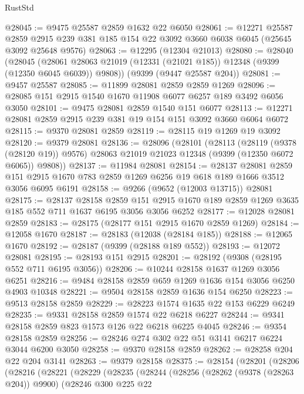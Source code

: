\begin{lexlean}{RustStd}
\begin{coremodule}
@28045 := @9475 @25587 @2859 @1632 @22 @6050
@28061 := @12271
    @25587
    @2859
    @2915
    @239
    @381
    @185
    @154
    @22
    @3092
    @3660
    @6038
    @6045
    (@25645 @3092 @25648 @9576)
@28063 := @12295 (@12304 @21013)
@28080 := @28040
    (@28045 (@28061 @28063 @21019 (@12331 (@21021 @185)) @12348 (@9399 (@12350 @6045 @6039)) @9808))
    (@9399 (@9447 @25587 @204))
@28081 := @9457 @25587
@28085 := @11899 @28081 @2859 @2859 @1269
@28096 := @28085 @151 @2915 @1540 @1670 @11908 @6077 @6257 @189 @3492 @6056 @3050
@28101 := @9475 @28081 @2859 @1540 @151 @6077
@28113 := @12271 @28081 @2859 @2915 @239 @381 @19 @154 @151 @3092 @3660 @6064 @6072
@28115 := @9370 @28081 @2859
@28119 := @28115 @19 @1269 @19 @3092
@28120 := @9379 @28081
@28136 := @28096
    (@28101
      (@28113
        (@28119 (@9378 (@28120 @19)) @9576)
        @28063
        @21019
        @21023
        @12348
        (@9399 (@12350 @6072 @6065))
        @9808))
@28137 := @11984 @28081
@28154 := @28137
    @28081
    @2859
    @151
    @2915
    @1670
    @783
    @2859
    @1269
    @6256
    @19
    @618
    @189
    @1666
    @3512
    @3056
    @6095
    @6191
@28158 := @9266 (@9652 (@12003 @13715)) @28081
@28175 := @28137
    @28158
    @2859
    @151
    @2915
    @1670
    @189
    @2859
    @1269
    @3635
    @185
    @552
    @711
    @1637
    @6195
    @3056
    @3056
    @6252
@28177 := @12028 @28081 @2859
@28183 := @28175 (@28177 @151 @2915 @1670 @2859 @1269)
@28184 := @12058 @1670
@28187 := @28183 (@12038 (@28184 @185))
@28188 := @12065 @1670
@28192 := @28187 (@9399 (@28188 @189 @552))
@28193 := @12072 @28081
@28195 := @28193 @151 @2915
@28201 := @28192 (@9308 (@28195 @552 @711 @6195 @3056))
@28206 := @10244 @28158 @1637 @1269 @3056 @6251
@28216 := @9484 @28158 @2859 @659 @1269 @1636 @154 @3056 @6250 @4903 @10348
@28221 := @9504 @28158 @2859 @1636 @154 @6250
@28223 := @9513 @28158 @2859
@28229 := @28223 @1574 @1635 @22 @153 @6229 @6249
@28235 := @9331 @28158 @2859 @1574 @22 @6218 @6227
@28244 := @9341 @28158 @2859 @823 @1573 @126 @22 @6218 @6225 @4045
@28246 := @9354 @28158 @2859
@28256 := @28246 @274 @302 @22 @51 @3141 @6217 @6224 @3044 @6200 @3050
@28258 := @9370 @28158 @2859
@28262 := @28258 @204 @22 @204 @3141
@28263 := @9379 @28158
@28375 := @28154
    (@28201
      (@28206
        (@28216
          (@28221
            (@28229
              (@28235
                (@28244
                  (@28256
                    (@28262 (@9378 (@28263 @204)) @9900)
                    (@28246
                      @300
                      @225
                      @22

\end{coremodule}
\end{lexlean}
